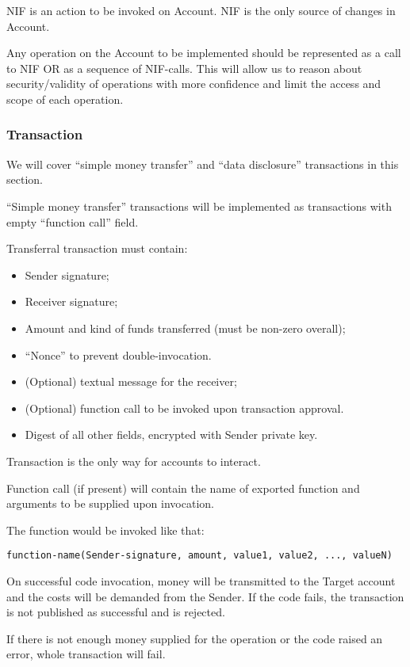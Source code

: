 NIF is an action to be invoked on Account.
NIF is the only source of changes in Account.

Any operation on the Account to be implemented should be represented as a call to NIF OR as a sequence of NIF-calls.
This will allow us to reason about security/validity of operations with more confidence and limit the access and scope of each operation.

\subsubsection{Transaction}

We will cover ``simple money transfer'' and ``data disclosure'' transactions in this section.

``Simple money transfer'' transactions will be implemented as transactions with empty ``function call'' field.

Transferral transaction must contain:
\begin{itemize}
  \item Sender signature;
  \item Receiver signature;
  \item Amount and kind of funds transferred (must be non-zero overall);
  \item ``Nonce'' to prevent double-invocation.
  \item (Optional) textual message for the receiver;
  \item (Optional) function call to be invoked upon transaction approval.
  \item Digest of all other fields, encrypted with Sender private key.
\end{itemize}

Transaction is the only way for accounts to interact.

Function call (if present) will contain the name of exported function and arguments to be supplied upon invocation.

The function would be invoked like that:

\begin{verbatim}
function-name(Sender-signature, amount, value1, value2, ..., valueN)
\end{verbatim}

On successful code invocation, money will be transmitted to the Target account and the costs will be demanded from the Sender.
If the code fails, the transaction is not published as successful and is rejected.

If there is not enough money supplied for the operation or the code raised an error, whole transaction will fail.

